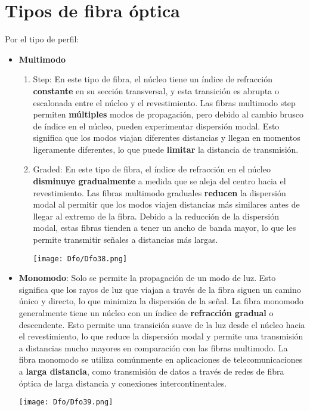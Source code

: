 \documentclass[
	12pt, %
	fleqn, %
	a4paper, %
	oneside, %
]{LegrandOrangeBook}
\begin{document}
\section{Tipos de fibra óptica}
Por el tipo de perfil:
\begin{itemize}
\item \textbf{Multimodo}
\begin{enumerate}
\item Step: En este tipo de fibra, el núcleo tiene un índice de refracción \textbf{constante} en su sección transversal, y esta transición es abrupta o escalonada entre el núcleo y el revestimiento. Las fibras multimodo step permiten \textbf{múltiples} modos de propagación, pero debido al cambio brusco de índice en el núcleo, pueden experimentar dispersión modal. Esto significa que los modos viajan diferentes distancias y llegan en momentos ligeramente diferentes, lo que puede \textbf{limitar} la distancia de transmisión.
\item Graded: En este tipo de fibra, el índice de refracción en el núcleo \textbf{disminuye gradualmente} a medida que se aleja del centro hacia el revestimiento. Las fibras multimodo graduales \textbf{reducen} la dispersión modal al permitir que los modos viajen distancias más similares antes de llegar al extremo de la fibra. Debido a la reducción de la dispersión modal, estas fibras tienden a tener un ancho de banda mayor, lo que les permite transmitir señales a distancias más largas.
\begin{center}
\texttt{[image: Dfo/Dfo38.png]}
\end{center}
\end{enumerate}
\item \textbf{Monomodo}: Solo se permite la propagación de un modo de luz. Esto significa que los rayos de luz que viajan a través de la fibra siguen un camino único y directo, lo que minimiza la dispersión de la señal. La fibra monomodo generalmente tiene un núcleo con un índice de \textbf{refracción gradual} o descendente. Esto permite una transición suave de la luz desde el núcleo hacia el revestimiento, lo que reduce la dispersión modal y permite una transmisión a distancias mucho mayores en comparación con las fibras multimodo. La fibra monomodo se utiliza comúnmente en aplicaciones de telecomunicaciones a \textbf{larga distancia}, como transmisión de datos a través de redes de fibra óptica de larga distancia y conexiones intercontinentales.
\begin{center}
\texttt{[image: Dfo/Dfo39.png]}
\end{center}
\end{itemize}
\end{document}
